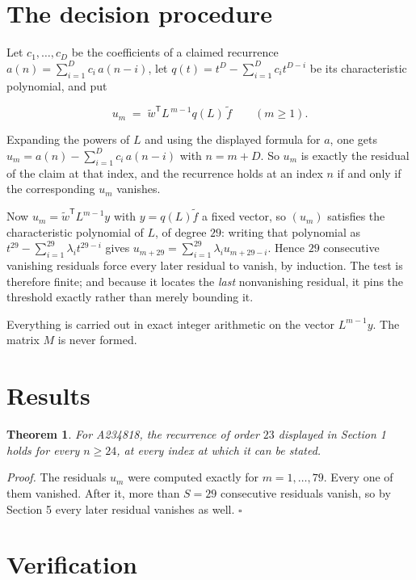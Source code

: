 \documentclass[11pt]{article}
\newtheorem{theorem}{Theorem}
\theoremstyle{definition}
\begin{document}
\section{The decision procedure}

Let $c_1,\dots,c_D$ be the coefficients of a claimed recurrence $a(n) = \sum_{i=1}^{D} c_i\,a(n-i)$, let $q(t) = t^{D} - \sum_{i=1}^{D} c_i t^{D-i}$ be its characteristic polynomial, and put

\[u_m \;=\; \tilde w^{\mathsf T} L^{\,m-1} q(L)\,\tilde f \qquad (m \ge 1).\]

Expanding the powers of $L$ and using the displayed formula for $a$, one gets $u_m = a(n) - \sum_{i=1}^{D} c_i\,a(n-i)$ with $n = m + D$. So $u_m$ is exactly the residual of the claim at that index, and the recurrence holds at an index $n$ if and only if the corresponding $u_m$ vanishes.

Now $u_m = \tilde w^{\mathsf T} L^{m-1} y$ with $y = q(L)\tilde f$ a fixed vector, so $(u_m)$ satisfies the characteristic polynomial of $L$, of degree $29$: writing that polynomial as $t^{29} - \sum_{i=1}^{29} \lambda_i t^{29-i}$ gives $u_{m+29} = \sum_{i=1}^{29} \lambda_i u_{m+29-i}$. Hence $29$ consecutive vanishing residuals force every later residual to vanish, by induction. The test is therefore finite; and because it locates the {\itshape last} nonvanishing residual, it pins the threshold exactly rather than merely bounding it.

Everything is carried out in exact integer arithmetic on the vector $L^{m-1}y$. The matrix $M$ is never formed.

\section{Results}

\begin{theorem} For A234818, the recurrence of order $23$ displayed in Section 1 holds for every $n \ge 24$, at every index at which it can be stated.\end{theorem}

{\itshape Proof.} The residuals $u_m$ were computed exactly for $m = 1,\dots,79$. Every one of them vanished. After it, more than $S = 29$ consecutive residuals vanish, so by Section 5 every later residual vanishes as well. $\square$

\section{Verification}
\end{document}
